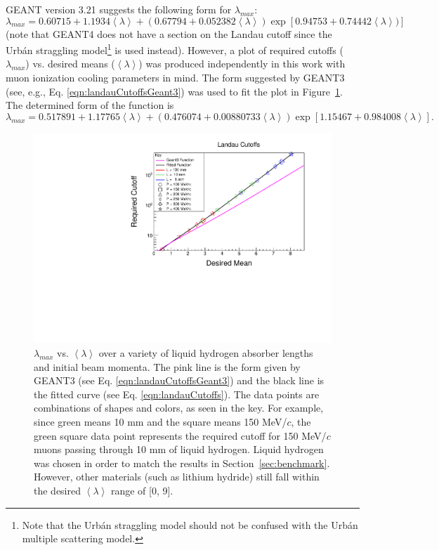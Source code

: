 GEANT version 3.21 \cite{geant3.21} suggests the following form for $\lambda_{max}$:
\begin{equation} \label{eqn:landauCutoffsGeant3}
\lambda_{max}=0.60715+1.1934\left<\lambda\right>+(0.67794+0.052382\left<\lambda\right>)\exp[0.94753+0.74442\left<\lambda\right>)]
\end{equation}
(note that GEANT4 does not have a section on the Landau cutoff since the Urb\'{a}n straggling model\footnote{Note that the Urb\'{a}n straggling model should not be confused with the Urb\'{a}n multiple scattering model.} is used instead). However, a plot of required cutoffs ($\lambda_{max}$) vs. desired means ($\left<\lambda\right>$) was produced independently in this work with muon ionization cooling parameters in mind. The form suggested by GEANT3 (see, e.g., Eq. \eqref{eqn:landauCutoffsGeant3}) was used to fit the plot in Figure~\ref{fig:landau_cutoffs}. The determined form of the function is
\begin{equation}\label{eqn:landauCutoffs}
\lambda_{max}=0.517891+1.17765\left<\lambda\right>+(0.476074+0.00880733\left<\lambda\right>)\exp[1.15467+0.984008\left<\lambda\right>].
\end{equation}

\begin{figure}
  \centering
    \includegraphics[width=\textwidth]{Figures/landau_cutoffs} 
  \caption[$\lambda_{max}$ vs. $\left<\lambda\right>$ over a variety of liquid hydrogen absorber lengths and initial beam momenta.]{$\lambda_{max}$ vs. $\left<\lambda\right>$ over a variety of liquid hydrogen absorber lengths and initial beam momenta. The pink line is the form given by GEANT3 (see Eq. \eqref{eqn:landauCutoffsGeant3}) and the black line is the fitted curve (see Eq. \eqref{eqn:landauCutoffs}). The data points are combinations of shapes and colors, as seen in the key. For example, since green means 10 mm and the square means 150 MeV/$c$, the green square data point represents the required cutoff for 150 MeV/$c$ muons passing through 10 mm of liquid hydrogen. Liquid hydrogen was chosen in order to match the results in Section~\ref{sec:benchmark}. However, other materials (such as lithium hydride) still fall within the desired $\left<\lambda\right>$ range of [0, 9].}
  \label{fig:landau_cutoffs}
\end{figure}

